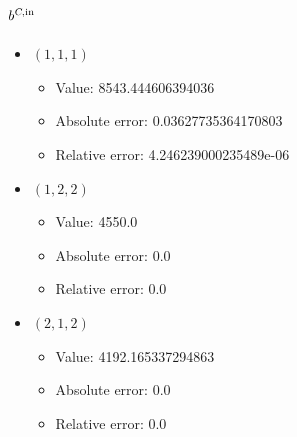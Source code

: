 \documentclass{article}%
\begin{document}
\subsection{$b^{\textsl{C},\text{in}}$}%
\begin{itemize}%
	\item $(1, 1, 1)$%
	\begin{itemize}%
		\item Value: 8543.444606394036%
		\item Absolute error: 0.03627735364170803%
		\item Relative error: 4.246239000235489e-06%
	\end{itemize}%
	\item $(1, 2, 2)$%
	\begin{itemize}%
		\item Value: 4550.0%
		\item Absolute error: 0.0%
		\item Relative error: 0.0%
	\end{itemize}%
	\item $(2, 1, 2)$%
	\begin{itemize}%
		\item Value: 4192.165337294863%
		\item Absolute error: 0.0%
		\item Relative error: 0.0%
	\end{itemize}%
\end{itemize}%
\end{document}
